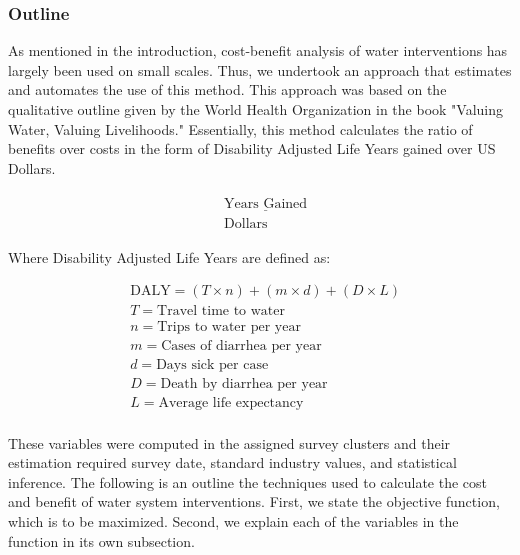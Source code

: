

\subsubsection*{Outline}
As mentioned in the introduction, cost-benefit analysis of water interventions has largely been used on small scales. 
Thus, we undertook an approach that estimates and automates the use of this method.
This approach was based on the qualitative outline given by the World Health Organization in the book "Valuing Water, Valuing Livelihoods."
Essentially, this method calculates the ratio of benefits over costs in the form of Disability Adjusted Life Years gained over US Dollars.

\begin{equation}
\begin{aligned}
& \begin{matrix} \underline{\text{Years Gained}} \\ \text{Dollars} \end{matrix}
\end{aligned}
\end{equation}

Where Disability Adjusted Life Years are defined as:

\begin{equation}
\begin{aligned}
& \text{DALY} = (T \times n) + (m \times d) + (D \times L)\\
& T = \text{Travel time to water}\\
& n = \text{Trips to water per year}\\
& m = \text{Cases of diarrhea per year}\\
& d = \text{Days sick per case}\\
& D = \text{Death by diarrhea per year}\\
& L = \text{Average life expectancy}\\
\end{aligned}
\end{equation}

These variables were computed in the assigned survey clusters and their estimation required survey date, standard industry values, and statistical inference.
The following is an outline the techniques used to calculate the cost and benefit of water system interventions.
First, we state the objective function, which is to be maximized. 
Second, we explain each of the variables in the function in its own subsection.

